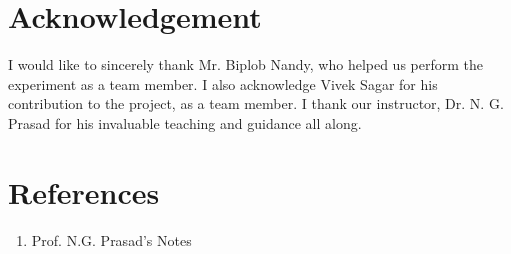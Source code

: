\section{Acknowledgement}
	I would like to sincerely thank Mr. Biplob Nandy, who helped us perform the experiment as a team member. I also acknowledge Vivek Sagar for his contribution to the project, as a team member. I thank our instructor, Dr. N. G. Prasad for his invaluable teaching and guidance all along.

\section{References}
	\begin{enumerate}
		\item Prof. N.G. Prasad's Notes
	\end{enumerate}